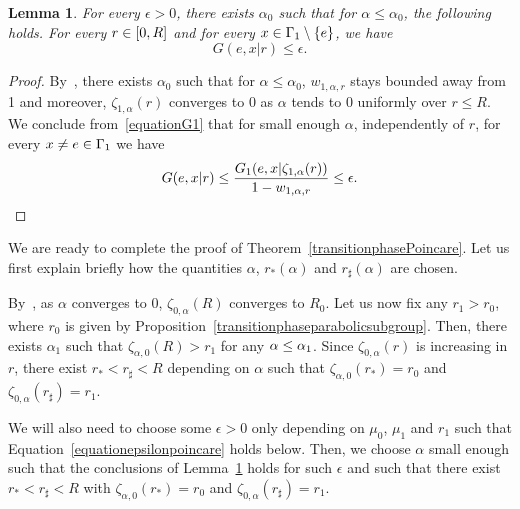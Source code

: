 \documentclass[10pt]{amsart}
\newtheorem{lemm}[theo]{Lemma}\newtheorem{prop}[theo]{Proposition}\newtheorem{coro}[theo]{Corollary}\newtheorem{conj}[theo]{Conjecture}
\theoremstyle{definition}\newtheorem{defi}[theo]{Definition}\newtheorem{rema}[theo]{Remark}\newtheorem{exam}[theo]{Example}\newtheorem{exem}[theo]{Example}\newtheorem{nota}[theo]{Notation}
\let\oldin\in
\renewcommand{\in}{\mathchoice{\oldin}{\oldin}{\,\oldin\,}{\,\oldin\,}}
\let\oldle\le
\renewcommand{\le}{\mathchoice{\oldle}{\oldle}{\,\oldle\,}{\,\oldle\,}}
\begin{document}
\begin{lemm}\label{lemmaDWY(14)}
For every $\epsilon>0$, there exists $\alpha_0$ such that for $\alpha\leq \alpha_0$, the following holds. For every $r\in [0,R]$ and for every $x\in \Gamma_1\setminus\{e\}$, we have
\[
G(e,x|r)\leq \epsilon.
\]
\end{lemm}

\begin{proof}
By~\cite[Lemma~3.15]{DWY}, there exists $\alpha_0$ such that for $\alpha\leq \alpha_0$, $w_{1,\alpha,r}$ stays bounded away from 1 and moreover, $\zeta_{1,\alpha}(r)$ converges to 0 as $\alpha$ tends to 0 uniformly over $r\leq R$. We conclude from~\eqref{equationG1} that for small enough $\alpha$, independently of $r$, for every $x\neq e\in \Gamma_1$ we have
\begin{equation*}\label{thirdboundpoincare}
G(e,x|r)\leq \frac{G_1(e,x|\zeta_{1,\alpha}(r))}{1-w_{1,\alpha,r}}\leq \epsilon. \qedhere
\end{equation*}
\end{proof}



We are ready to complete the proof of Theorem~\ref{transitionphasePoincare}. Let us first explain briefly how the quantities $\alpha$, $r_*(\alpha)$ and $r_\sharp(\alpha)$ are chosen.

By~\cite[Lemma~3.14]{DWY}, as $\alpha$ converges to 0, $\zeta_{0,\alpha}(R)$ converges to $R_0$. Let us now fix any $r_1>r_0$, where $r_0$ is given by Proposition~\ref{transitionphaseparabolicsubgroup}. Then, there exists $\alpha_1$ such that $\zeta_{\alpha, 0}(R)>r_1$ for any $\alpha\le \alpha_1$. Since $\zeta_{0,\alpha}(r)$ is increasing in $r$, there exist $r_*<r_\sharp <R$ depending on $\alpha$ such that $\zeta_{\alpha,0}(r_*)=r_0$ and $\zeta_{0,\alpha}(r_\sharp)=r_1$.

We will also need to choose some $\epsilon>0$ only depending on $\mu_0$, $\mu_1$ and $r_1$ such that Equation~\eqref{equationepsilonpoincare} holds below. Then, we choose $\alpha$ small enough such that the conclusions of Lemma~\ref{lemmaDWY(14)} holds for such $\epsilon$ and such that there exist $r_*<r_\sharp <R$ with $\zeta_{\alpha,0}(r_*)=r_0$ and $\zeta_{0,\alpha}(r_\sharp)=r_1$.
\end{document}
